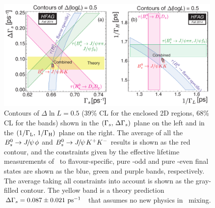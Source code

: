 \begin{figure}
\begin{center}
\includegraphics[width=0.99\textwidth]{figures/life_mix/hfag_Fall2014_DGsGs_tauLtauH}
\caption{Contours of $\Delta \ln L = 0.5$ (39\% CL for the enclosed 2D regions, 68\% CL for the bands)
shown in the $(\Gamma_{s},\,\Delta\Gamma_{s})$ plane on the left
and in the $(1/\Gamma_{\rm L},\,1/\Gamma_{\rm H})$ plane on the right. 
The average of all the $B^0_s \to {J\mskip -3mu/\mskip -2mu\psi\mskip 2mu}\phi$ and $B^0_s\to {J\mskip -3mu/\mskip -2mu\psi\mskip 2mu} K^+K^-$ 
results is shown as the red contour,
and the constraints given by the effective lifetime measurements of
\Bs\ to flavour-specific, pure \CP-odd and pure \CP-even final states
are shown as the blue, green and purple bands, 
respectively. The average taking all constraints into account is shown as the gray-filled contour.
The yellow band is a theory prediction
$\Delta\Gamma_{s} = 0.087 \pm 0.021~\hbox{ps}^{-1}$~\cite{Lenz:2011ti,*Lenz:2006hd}
that assumes no new physics in \Bs\ mixing.}
\end{center}
\end{figure}

